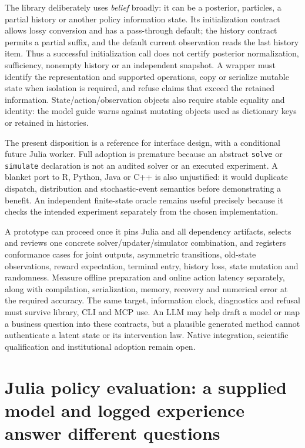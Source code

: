 The library deliberately uses \emph{belief} broadly: it can be a posterior,
particles, a partial history or another policy information state. Its
initialization contract allows lossy conversion and has a pass-through default;
the history contract permits a partial suffix, and the default current
observation reads the last history item. Thus a successful initialization call
does not certify posterior normalization, sufficiency, nonempty history or an
independent snapshot. A wrapper must identify the representation and supported
operations, copy or serialize mutable state when isolation is required, and
refuse claims that exceed the retained information. State/action/observation
objects also require stable equality and identity: the model guide warns
against mutating objects used as dictionary keys or retained in histories.
\citep{exec23_pomdpsjl_sources}

The present disposition is a reference for interface design, with a conditional
future Julia worker. Full adoption is premature because an abstract
\texttt{solve} or \texttt{simulate} declaration is not an audited solver or
an executed experiment. A blanket port to R, Python, Java or C++ is also
unjustified: it would duplicate dispatch, distribution and stochastic-event
semantics before demonstrating a benefit. An independent finite-state oracle
remains useful precisely because it checks the intended experiment separately
from the chosen implementation.
\citep{exec23_pomdpsjl_sources,exec23_pomdpsjl_reference}

A prototype can proceed once it pins Julia and all dependency artifacts,
selects and reviews one concrete solver/updater/simulator combination, and
registers conformance cases for joint outputs, asymmetric transitions,
old-state observations, reward expectation, terminal entry, history loss,
state mutation and randomness. Measure offline preparation and online action
latency separately, along with compilation, serialization, memory, recovery
and numerical error at the required accuracy. The same target, information
clock, diagnostics and refusal must survive library, CLI and MCP use.
An LLM may help draft a model or map a business question into these contracts,
but a plausible generated method cannot authenticate a latent state or its
intervention law. Native integration, scientific qualification and institutional
adoption remain open.
\citep{exec23_pomdpsjl_sources}


\section{Julia policy evaluation: a supplied model and logged experience answer different questions}
\label{sec:exec24-policies-other}

